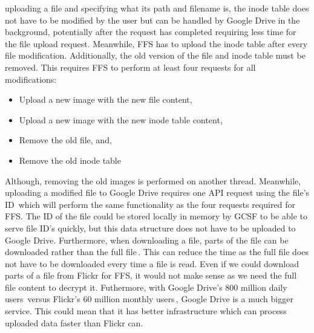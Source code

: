 uploading a file and specifying what its path and filename is, the inode table does not have to be modified by the user but can be handled by Google Drive in the background, potentially after the request has completed requiring less time for the file upload request. Meanwhile, \gls{FFS} has to upload the inode table after every file modification. Additionally, the old version of the file and inode table must be removed. This requires \gls{FFS} to perform at least four requests for all modifications:
\begin{itemize}
	\item Upload a new image with the new file content,
	\item Upload a new image with the new inode table content,
	\item Remove the old file, and,
	\item Remove the old inode table
\end{itemize}
Although, removing the old images is performed on another thread. Meanwhile, uploading a modified file to Google Drive requires one \gls{API} request using the file's ID\,\cite{FilesUpdateDrive2022} which will perform the same functionality as the four requests required for \gls{FFS}. The ID of the file could be stored locally in memory by \gls{GCSF} to be able to serve file ID's quickly, but this data structure does not have to be uploaded to Google Drive. Furthermore, when downloading a file, parts of the file can be downloaded rather than the full file\,\cite{googleDownloadFilesDrive2022}. This can reduce the time as the full file does not have to be downloaded every time a file is read. Even if we could download parts of a file from Flickr for \gls{FFS}, it would not make sense as we need the full file content to decrypt it. Futhermore, with Google Drive's 800 million daily users\,\cite{lardinoisGoogleUpdatesDrive2017} versus Flickr's 60 million monthly users\,\cite{campbellFlickrStatistics20222022}, Google Drive is a much bigger service. This could mean that it has better infrastructure which can process uploaded data faster than Flickr can.

